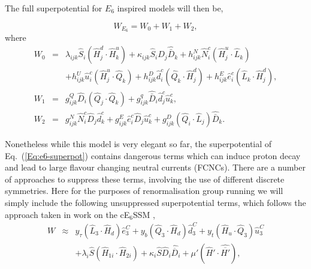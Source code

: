 \documentclass[preprint,amsmath,amssymb,aps,superscriptaddress,prd,showpacs,floatfix,nofootinbib]{revtex4-1}
\newcommand{\be}{\begin{equation}}
\newcommand{\ee}{\end{equation}}
\newcommand{\ba}{\begin{eqnarray}}
\newcommand{\ea}{\end{eqnarray}}
\newcommand{\SuperField}[1]{\hat{#1}}
\begin{document}
The full superpotential for $E_6$ inspired models will then be,

\be
W_{E_6} = W_0 + W_1 + W_2,
\label{Eq:e6-superpot}
\ee where
\begin{eqnarray}
W_0 &=& \lambda_{ijk} \hat{S}_i \left ( \hat{H}^d_{j} \cdot\hat{H}^u_{k}\right ) + \kappa_{ijk} \hat{S}_i \hat{D}_j \hat{\bar{D}}_k + h^N_{ijk} \hat{N}^c_i \left ( \hat{H}^u_{j} \cdot \hat{L}_k\right ) \nonumber \\
& & + h^U_{ijk} \hat{u}^c_i \left ( \hat{H}^u_{j} \cdot \hat{Q}_k\right ) + h^D_{ijk} \hat{d}^c_i \left ( \hat{Q}_k\cdot\hat{H}^d_{j}\right )  + h^E_{ijk} \hat{e}^c_i \left ( \hat{L}_k\cdot\hat{H}^d_{j}\right ) , \\
W_1 &=& g^Q_{ijk} \hat{D}_i \left ( \hat{Q}_j \cdot \hat{Q}_k \right )+ g^q_{ijk} \hat{\bar{D}}_i \hat{d}^c_j \hat{u}^c_k, \\
W_2 &=& g^N_{ijk} \hat{N}^c_i \hat{D}_j \hat{d}^c_k + g^E_{ijk} \hat{e}^c_i \hat{D}_j \hat{u}^c_k + g^D_{ijk} \left ( \hat{Q}_i \cdot \hat{L}_j \right )\hat{\bar{D}}_k.
\label{Eq:e6-superpot-parts}
\end{eqnarray}

Nonetheless while this model is very elegant so far, the
superpotential of Eq.~(\ref{Eq:e6-superpot}) contains dangerous terms which
can induce proton decay and lead to large flavour changing neutral
currents (FCNCs).  There are a number of approaches to suppress these
terms, involving the use of different discrete symmetries.  Here for
the purposes of renormalisation group running we will simply include
the following unsuppressed superpotential terms, which follows the
approach taken in work on the cE$_6$SSM \cite{Athron:2009ue,
  Athron:2009bs},
%
    \ba
    W &\approx& y_{\tau} \left (\SuperField{L}_3 \cdot \SuperField{H}_d
     \right ) \SuperField{e}^C_3 + y_b \left (\SuperField{Q}_3\cdot\SuperField{H}_d
     \right ) \SuperField{d}_3^C + y_t \left (\SuperField{H}_u\cdot\SuperField{Q}_3
     \right ) \SuperField{u}_3^C\\
    &&
    + \lambda_i \SuperField{S} \left (\SuperField{H}_{1i}
    \cdot \SuperField{H}_{2i} \right ) + \kappa_i \SuperField{S} \SuperField{D}_i
    \SuperField{\overline{D}}_i + \mu' \left (\SuperField{H}'\cdot
    \SuperField{\overline{H'}}\right ),
    \ea
  \label{SuPot_RGE}
%  
\end{document}
